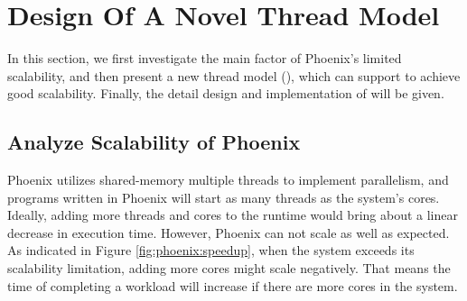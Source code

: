 \section{Design Of A Novel Thread Model}
\label{sec:design}
In this section, we first investigate the main factor of Phoenix's limited scalability, 
and then present a new thread model (\myth), which can support \myds to achieve good scalability.
Finally, the detail design and implementation of \myth will be given.


\subsection{Analyze Scalability of Phoenix}
Phoenix utilizes shared-memory multiple threads to implement parallelism, and programs written in Phoenix will start as many threads as the system's cores.
Ideally, adding more threads and cores to the runtime would bring about a linear decrease in execution time.
However, Phoenix can not scale as well as expected.
As indicated in Figure \ref{fig:phoenix:speedup}, when the system exceeds its scalability limitation, adding more cores might scale negatively.
That means the time of completing a workload will increase if there are more cores in the system. 

